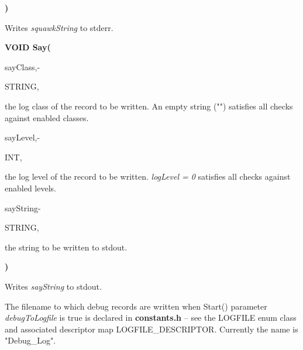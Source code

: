 \textbf{)}

\medskip
Writes \textit{squawkString} to stderr.

\bigskip
\textbf{VOID Say(}

\hfill
\begin{minipage}{\dimexpr\textwidth-2em}

        \medskip
        \begin{minipage}[t][][b]{9.5em}sayClass,\hfill{-}\end{minipage}
        \begin{minipage}[t][][b]{5.5em}STRING,\hfill\end{minipage}
        \begin{minipage}[t][][b]{\dimexpr\textwidth-15.5em}
            the log class of the record to be written. An empty string ("") satisfies all checks against enabled classes.
        \end{minipage}\vfill

        \medskip
        \begin{minipage}[t][][b]{9.5em}sayLevel,\hfill{-}\end{minipage}
        \begin{minipage}[t][][b]{5.5em}INT,\hfill\end{minipage}
        \begin{minipage}[t][][b]{\dimexpr\textwidth-15.5em}
            the log level of the record to be written. \textit{logLevel = 0} satisfies all checks against enabled levels.
        \end{minipage}\vfill

        \medskip
        \begin{minipage}[t][][b]{9.5em}sayString\hfill{-}\end{minipage}
        \begin{minipage}[t][][b]{5.5em}STRING,\hfill\end{minipage}
        \begin{minipage}[t][][b]{\dimexpr\textwidth-15.5em}
            the string to be written to stdout.
        \end{minipage}\vfill
\end{minipage}

\textbf{)}

\medskip
Writes \textit{sayString} to stdout.

The filename to which debug records are written when Start() parameter \textit{debugToLogfile} is true  is declared in \textbf{constants.h} -- see the LOGFILE enum class and associated descriptor map LOGFILE\_DESCRIPTOR. Currently the name is "Debug\_Log".

